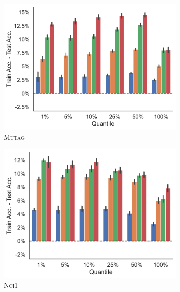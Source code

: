 \begin{figure}[!htb]
	\begin{subfigure}[b]{0.3\textwidth}
		\centering
		\includegraphics[width=\textwidth]{Figures/train_test_diff_k_wl_MUTAG.pdf}
		\vspace*{-4ex} 
		\caption{\textsc{Mutag}}
	\end{subfigure}
	\par\bigskip
	\begin{subfigure}[b]{0.3\textwidth}
		\centering
		\includegraphics[width=\textwidth]{Figures/train_test_diff_k_wl_NCI1.pdf}
		\vspace*{-4ex} 
		\caption{\textsc{Nci1}}
	\end{subfigure}
	\hfill
	\begin{subfigure}[b]{0.3\textwidth}
		\centering

\end{subfigure}
\end{figure}

